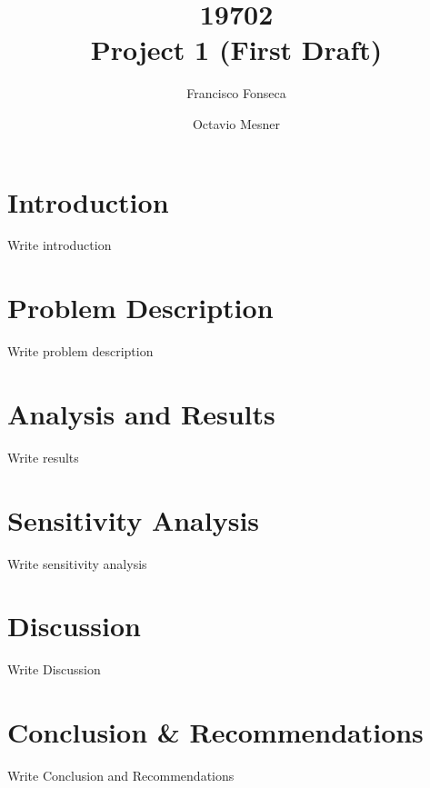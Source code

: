 \documentclass[11pt, letterpaper]{article}
\title{\vspace{-2cm} 19702 \\ Project 1 (First Draft)}
\author{Francisco Fonseca \and Octavio Mesner}
\date{\mydate}
\date{\mydateformat\normalsize\mydate} %
\begin{document}
\maketitle %

\section{Introduction}

Write introduction

\section{Problem Description}

Write problem description

\section{Analysis and Results}

Write results

\section{Sensitivity Analysis}

Write sensitivity analysis

\section{Discussion}

Write Discussion

\section{Conclusion \& Recommendations}

Write Conclusion and Recommendations
\end{document}
